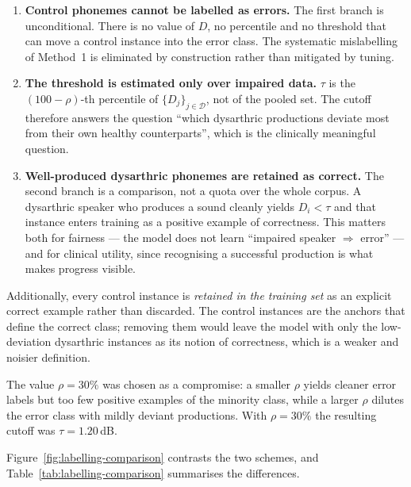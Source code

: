 \begin{enumerate}[leftmargin=*]
  \item \textbf{Control phonemes cannot be labelled as errors.} The first branch
        is unconditional. There is no value of $D$, no percentile and no
        threshold that can move a control instance into the error class. The
        systematic mislabelling of Method~1 is eliminated by construction rather
        than mitigated by tuning.
  \item \textbf{The threshold is estimated only over impaired data.} $\tau$ is
        the $(100-\rho)$-th percentile of $\{D_j\}_{j \in \mathcal{D}}$, not of
        the pooled set. The cutoff therefore answers the question ``which
        dysarthric productions deviate most from their own healthy
        counterparts'', which is the clinically meaningful question.
  \item \textbf{Well-produced dysarthric phonemes are retained as correct.} The
        second branch is a comparison, not a quota over the whole corpus. A
        dysarthric speaker who produces a sound cleanly yields $D_i < \tau$ and
        that instance enters training as a positive example of correctness.
        This matters both for fairness --- the model does not learn ``impaired
        speaker $\Rightarrow$ error'' --- and for clinical utility, since
        recognising a successful production is what makes progress visible.
\end{enumerate}

Additionally, every control instance is \emph{retained in the training set} as
an explicit correct example rather than discarded. The control instances are
the anchors that define the correct class; removing them would leave the model
with only the low-deviation dysarthric instances as its notion of correctness,
which is a weaker and noisier definition.

The value $\rho = 30\%$ was chosen as a compromise: a smaller $\rho$ yields
cleaner error labels but too few positive examples of the minority class, while
a larger $\rho$ dilutes the error class with mildly deviant productions. With
$\rho = 30\%$ the resulting cutoff was $\tau = 1.20$\,dB.

Figure~\ref{fig:labelling-comparison} contrasts the two schemes, and
Table~\ref{tab:labelling-comparison} summarises the differences.


